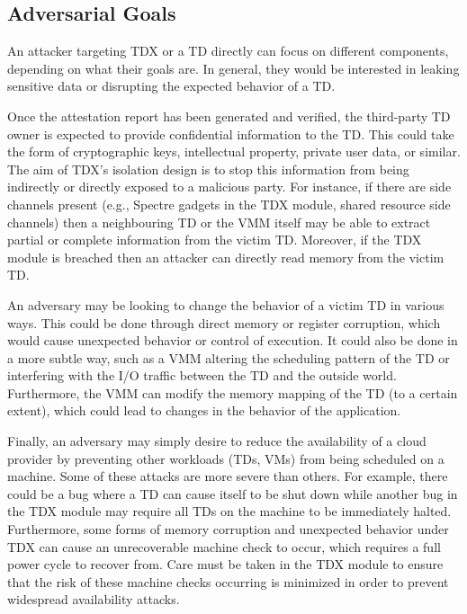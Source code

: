 \subsection{Adversarial Goals}
An attacker targeting TDX or a TD directly can focus on different components, depending on what their goals are. In general, they would be interested in leaking sensitive data or disrupting the expected behavior of a TD. 


Once the attestation report has been generated and verified, the third-party TD owner is expected to provide confidential information to the TD. This could take the form of cryptographic keys, intellectual property, private user data, or similar. The aim of TDX’s isolation design is to stop this information from being indirectly or directly exposed to a malicious party. For instance, if there are side channels present (e.g., Spectre gadgets in the TDX module, shared resource side channels) then a neighbouring TD or the VMM itself may be able to extract partial or complete information from the victim TD. Moreover, if the TDX module is breached then an attacker can directly read memory from the victim TD.


An adversary may be looking to change the behavior of a victim TD in various ways. This could be done through direct memory or register corruption, which would cause unexpected behavior or control of execution. It could also be done in a more subtle way, such as a VMM altering the scheduling pattern of the TD or interfering with the I/O traffic between the TD and the outside world. Furthermore, the VMM can modify the memory mapping of the TD (to a certain extent), which could lead to changes in the behavior of the application.


Finally, an adversary may simply desire to reduce the availability of a cloud provider by preventing other workloads (TDs, VMs) from being scheduled on a machine. Some of these attacks are more severe than others. For example, there could be a bug where a TD can cause itself to be shut down while another bug in the TDX module may require all TDs on the machine to be immediately halted. Furthermore, some forms of memory corruption and unexpected behavior under TDX can cause an unrecoverable machine check to occur, which requires a full power cycle to recover from. Care must be taken in the TDX module to ensure that the risk of these machine checks occurring is minimized in order to prevent widespread availability attacks.


